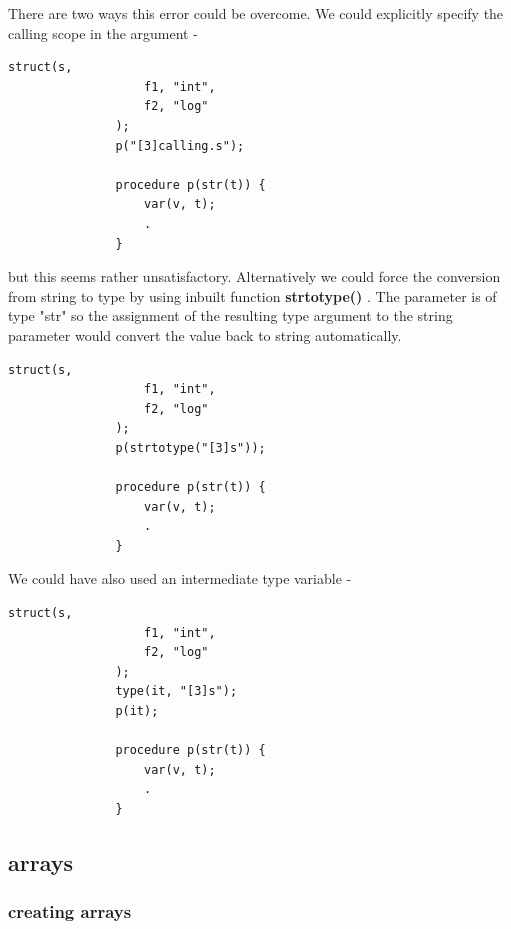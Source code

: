            There are two ways this error could be overcome. We could
            explicitly specify the calling scope in the argument -
            \begin{lstlisting}[gobble=12, language=threepl]
               struct(s,
                   f1, "int",
                   f2, "log"
               );
               p("[3]calling.s");

               procedure p(str(t)) {
                   var(v, t);
                   .
               }
            \end{lstlisting}
            but this seems rather unsatisfactory. Alternatively we could force the
            conversion from string to type by using inbuilt function {\bf
            strtotype()} . The parameter is of type "str" so
            the assignment of the resulting type argument to the string parameter
            would convert the value back to string automatically.
            \begin{lstlisting}[gobble=12, language=threepl]
               struct(s,
                   f1, "int",
                   f2, "log"
               );
               p(strtotype("[3]s"));

               procedure p(str(t)) {
                   var(v, t);
                   .
               }
            \end{lstlisting}
            We could have also used an intermediate type variable -
            \begin{lstlisting}[gobble=12, language=threepl]
               struct(s,
                   f1, "int",
                   f2, "log"
               );
               type(it, "[3]s");
               p(it);

               procedure p(str(t)) {
                   var(v, t);
                   .
               }
            \end{lstlisting}
            


        \subsection{arrays}

            \subsubsection{creating arrays}   


